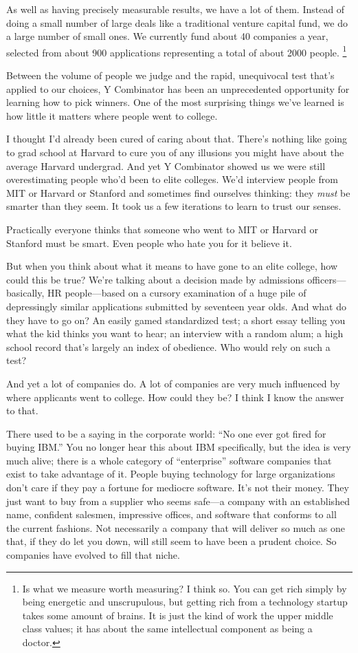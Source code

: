 As well as having precisely measurable results, we have a lot of them.
Instead of doing a small number of large deals like a traditional
venture capital fund, we do a large number of small ones. We currently
fund about 40 companies a year, selected from about 900 applications
representing a total of about 2000 people. \footnote{Is what we measure worth measuring? I think so. You can get rich
simply by being energetic and unscrupulous, but getting rich from a
technology startup takes some amount of brains. It is just the kind of
work the upper middle class values; it has about the same intellectual
component as being a doctor.}

Between the volume of people we judge and the rapid, unequivocal test
that's applied to our choices, Y Combinator has been an unprecedented
opportunity for learning how to pick winners. One of the most surprising
things we've learned is how little it matters where people went to
college.

I thought I'd already been cured of caring about that. There's nothing
like going to grad school at Harvard to cure you of any illusions you
might have about the average Harvard undergrad. And yet Y Combinator
showed us we were still overestimating people who'd been to elite
colleges. We'd interview people from MIT or Harvard or Stanford and
sometimes find ourselves thinking: they \emph{must} be smarter than they
seem. It took us a few iterations to learn to trust our senses.

Practically everyone thinks that someone who went to MIT or Harvard or
Stanford must be smart. Even people who hate you for it believe it.

But when you think about what it means to have gone to an elite college,
how could this be true? We're talking about a decision made by
admissions officers---basically, HR people---based on a cursory
examination of a huge pile of depressingly similar applications
submitted by seventeen year olds. And what do they have to go on? An
easily gamed standardized test; a short essay telling you what the kid
thinks you want to hear; an interview with a random alum; a high school
record that's largely an index of obedience. Who would rely on such a
test?

And yet a lot of companies do. A lot of companies are very much
influenced by where applicants went to college. How could they be? I
think I know the answer to that.

There used to be a saying in the corporate world: ``No one ever got
fired for buying IBM.'' You no longer hear this about IBM specifically,
but the idea is very much alive; there is a whole category of
``enterprise'' software companies that exist to take advantage of it.
People buying technology for large organizations don't care if they pay
a fortune for mediocre software. It's not their money. They just want to
buy from a supplier who seems safe---a company with an established name,
confident salesmen, impressive offices, and software that conforms to
all the current fashions. Not necessarily a company that will deliver so
much as one that, if they do let you down, will still seem to have been
a prudent choice. So companies have evolved to fill that niche.

